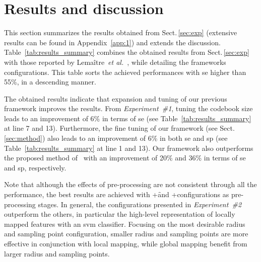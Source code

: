 
\section{Results and discussion}
\label{sec:res-dis}
This section summarizes the results obtained from Sect.\,\ref{sec:exp} (extensive results can be found in Appendix~\ref{app:1}) and extends the discussion.
Table~\ref{tab:results_summary} combines the obtained results from Sect.\,\ref{sec:exp} with those reported by Lema\^{i}tre~\emph{et al.}~\cite{Lemaintre2015miccaiOCT}, while detailing the frameworks configurations.
This table sorts the achieved performances with \ac{se} higher than 55\%, in a descending manner.

The obtained results indicate that expansion and tuning of our previous framework improves the results.
From \emph{Experiment~\#1}, tuning the codebook size leads to an improvement of 6\% in terms of \ac{se} (see Table~\ref{tab:results_summary} at line 7 and 13).
Furthermore, the fine tuning of our framework (see Sect.\,\ref{sec:method}) also leads to an improvement of 6\% in both \ac{se} and \ac{sp} (see Table~\ref{tab:results_summary} at line 1 and 13).
Our framework also outperforms the proposed method of~\cite{Venhuizen2015} with an improvement of 20\% and 36\% in terms of \ac{se} and \ac{sp}, respectively.

Note that although the effects of pre-processing are not consistent through all the performance, the best results are achieved with \nlm+\f and \nlm+\fal configurations as pre-processing stages.
In general, the configurations presented in \emph{Experiment~\#2} outperform the others, in particular the high-level representation of locally mapped features with an \ac{svm} classifier.  
Focusing on the most desirable radius and sampling point configuration, smaller radius and sampling points are more effective in conjunction with local mapping, while global mapping benefit from larger radius and sampling points.

